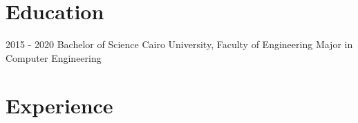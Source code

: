 \documentclass[letterpaper]{twentysecondcv} %
\begin{document}
\makeprofile %

\vspace{-0.25cm}
\section{Education}{\faGraduationCap}

\begin{twenty} %
	\twentyitemshorttest
    	{2015 - 2020}
        {}
        {Bachelor of Science}
        {Cairo University, Faculty of Engineering}
        {Major in Computer Engineering}

	
\end{twenty}



\section{Experience}{\faAlignJustify}
\end{document}
